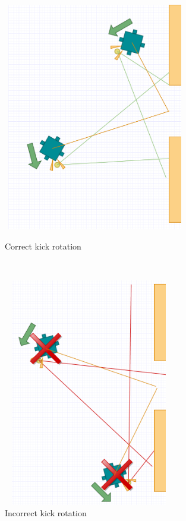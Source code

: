 \documentclass[a4paper,12pt]{article}
\begin{document}
\begin{figure}[ht!]
\begin{minipage}{0.5\textwidth}
\centering
\includegraphics[width=80mm,height=100mm]{goodkick.png}
\caption{Correct kick rotation}
\label{fig:correct}
\end{minipage}
~
\begin{minipage}{0.5\textwidth}
\centering
\includegraphics[width=75mm,height=100mm]{badkick.png}
\caption{Incorrect kick rotation}
\label{fig:incorrect}
\end{minipage}
\end{figure}
\end{document}
